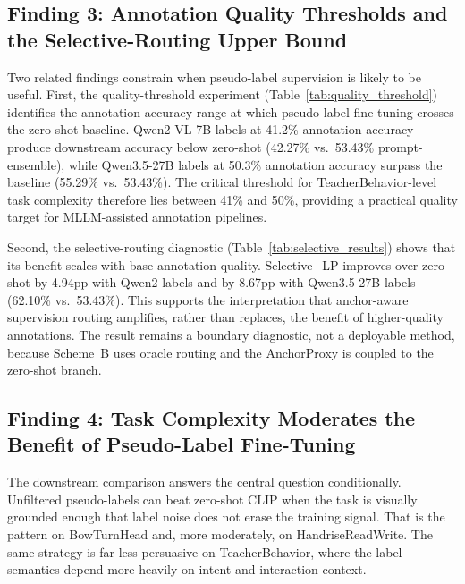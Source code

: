 \documentclass{ieeeaccess}
\begin{document}
\subsection{Finding 3: Annotation Quality Thresholds and the Selective-Routing Upper Bound}

Two related findings constrain when pseudo-label supervision is likely to
be useful.
First, the quality-threshold experiment (Table~\ref{tab:quality_threshold})
identifies the annotation accuracy range at which pseudo-label fine-tuning
crosses the zero-shot baseline.
Qwen2-VL-7B labels at 41.2\% annotation accuracy produce downstream
accuracy below zero-shot (42.27\% vs.\ 53.43\% prompt-ensemble), while Qwen3.5-27B
labels at 50.3\% annotation accuracy surpass the baseline (55.29\% vs.\
53.43\%).
The critical threshold for TeacherBehavior-level task complexity therefore
lies between 41\% and 50\%, providing a practical quality target for
MLLM-assisted annotation pipelines.

Second, the selective-routing diagnostic (Table~\ref{tab:selective_results})
shows that its benefit scales with base annotation quality.
Selective+LP improves over zero-shot by 4.94pp with Qwen2 labels and by
8.67pp with Qwen3.5-27B labels (62.10\% vs.\ 53.43\%).
This supports the interpretation that anchor-aware supervision routing
amplifies, rather than replaces, the benefit of higher-quality annotations.
The result remains a boundary diagnostic, not a deployable method, because
Scheme~B uses oracle routing and the AnchorProxy is coupled to the
zero-shot branch.

\subsection{Finding 4: Task Complexity Moderates the Benefit of
Pseudo-Label Fine-Tuning}

The downstream comparison answers the central question
conditionally.
Unfiltered pseudo-labels can beat zero-shot CLIP when the task is
visually grounded enough that label noise does not erase the training
signal.
That is the pattern on BowTurnHead and, more moderately, on
HandriseReadWrite.
The same strategy is far less persuasive on TeacherBehavior, where the
label semantics depend more heavily on intent and interaction context.
\end{document}
